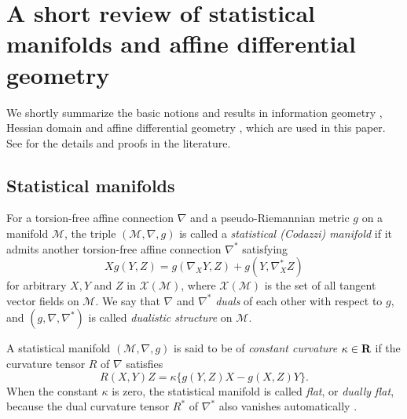 \documentclass{llncs}
\begin{document}
\appendix

\section{A short review of statistical manifolds and affine differential geometry}
We shortly summarize the basic notions and results in information geometry 
\cite{Amari85,AN}, Hessian domain \cite{Shima07} 
and affine differential geometry \cite{NS,Kurose94}, 
which are used in this paper.
See for the details and proofs in the literature.

\subsection{Statistical manifolds}
For a torsion-free affine connection $\nabla$ and a pseudo-Riemannian 
metric $g$ on a manifold $\mathcal{M}$, the triple $(\mathcal{M},\nabla,g)$ 
is called a {\em statistical (Codazzi) manifold} if 
it admits another torsion-free affine connection $\nabla^*$ satisfying
\begin{equation}
 Xg(Y,Z)=g(\nabla_X Y, Z)+g(Y, \nabla^*_X Z)
\label{dualistic}
\end{equation}
for arbitrary $X,Y$ and $Z$ in ${\mathcal X}(\mathcal{M})$, where ${\mathcal X}(\mathcal{M})$ is the set of all tangent vector fields on $\mathcal{M}$.
We say that $\nabla$ and $\nabla^*$ {\em duals} of each other 
with respect to $g$, and $(g,\nabla,\nabla^*)$ is called 
{\em dualistic structure} on $\mathcal{M}$.

A statistical manifold $(\mathcal{M},\nabla,g)$ is said to be of 
{\em constant curvature} $\kappa \in {\bf R}$ 
if the curvature tensor $R$ of $\nabla$ satisfies
\begin{equation}
 R(X,Y)Z=\kappa \{g(Y,Z)X-g(X,Z)Y\}.
\label{smcc}
\end{equation}
When the constant $\kappa$ is zero, the statistical manifold is called
{\em flat}, or {\em dually flat}, because the dual curvature tensor $R^*$ 
of $\nabla^*$ also vanishes automatically \cite{AN,Shima07}.
\end{document}
